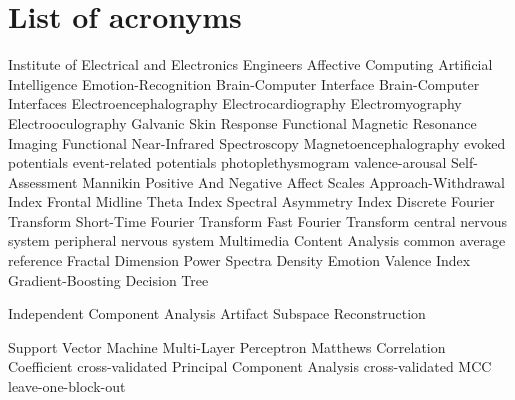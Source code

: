 \chapter{List of acronyms}

\begin{acronym}[TDMAAA]
					{Institute of Electrical and Electronics Engineers}
					{Affective Computing}	
					{Artificial Intelligence}
    			   {Emotion-Recognition}
    			   {Brain-Computer Interface}
    			   {Brain-Computer Interfaces}
    			   {Electroencephalography}
    				{Electrocardiography}
    		{Electromyography}
    	 	{Electrooculography}
    		{Galvanic Skin Response}
               {Functional Magnetic Resonance Imaging}
              {Functional Near-Infrared Spectroscopy}
               {Magnetoencephalography}
               {evoked potentials}
    		  {event-related potentials}
            {photoplethysmogram}
            {valence-arousal}
    		{Self-Assessment Mannikin}
    		{Positive And Negative Affect Scales}
    		{Approach-Withdrawal Index}
    		{Frontal Midline Theta Index}
    		{Spectral Asymmetry Index}
    		{Discrete Fourier Transform}
       {Short-Time Fourier Transform}
    		{Fast Fourier Transform}
    		{central nervous system}
    		{peripheral nervous system}
    		{Multimedia Content Analysis}	
    		{common average reference}
    		{Fractal Dimension}
    		{Power Spectra Density}
    		{Emotion Valence Index}
    		{Gradient-Boosting Decision Tree}
    
    
    
    		{Independent Component Analysis}
    		{Artifact Subspace Reconstruction}
    
    		{Support Vector Machine}
    		{Multi-Layer Perceptron}
    		{Matthews Correlation Coefficient}
			{cross-validated}
    		{Principal Component Analysis}
    		{cross-validated MCC}
    		{leave-one-block-out}
\end{acronym}

